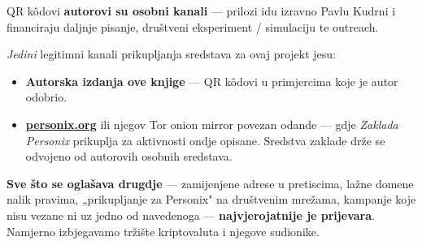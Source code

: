 \begin{minipage}[t]{0.60\textwidth}
\vspace{0pt}
\begin{mdframed}[
  linewidth=0.7pt,roundcorner=5pt,
  innerleftmargin=10pt,innerrightmargin=10pt,
  innertopmargin=8pt,innerbottommargin=8pt,
  skipabove=0pt,skipbelow=0pt,
  linecolor=cbwarning!50,backgroundcolor=cbwarning!5,
  nobreak=true,
  needspace=4\baselineskip,
]
\footnotesize
QR kôdovi \textbf{autorovi su osobni kanali} --- prilozi idu izravno Pavlu Kudrni i financiraju daljnje pisanje, društveni eksperiment / simulaciju te outreach.

\smallskip
\emph{Jedini} legitimni kanali prikupljanja sredstava za ovaj projekt jesu:

\smallskip
\begin{itemize}
\setlength{\itemsep}{0pt}
\setlength{\topsep}{0pt}
\item \textbf{Autorska izdanja ove knjige} --- QR kôdovi u primjercima koje je autor odobrio.
\item \href{https://personix.org}{\textbf{personix.org}} ili njegov Tor onion mirror povezan odande --- gdje \emph{Zaklada Personix} prikuplja za aktivnosti ondje opisane. Sredstva zaklade drže se odvojeno od autorovih osobnih sredstava.
\end{itemize}

\smallskip
\textbf{Sve što se oglašava drugdje} --- zamijenjene adrese u pretiscima, lažne domene nalik pravima, „prikupljanje za Personix" na društvenim mrežama, kampanje koje nisu vezane ni uz jedno od navedenoga --- \textbf{najvjerojatnije je prijevara}. Namjerno izbjegavamo tržište kriptovaluta i njegove sudionike.
\end{mdframed}
\end{minipage}

\clearpage
